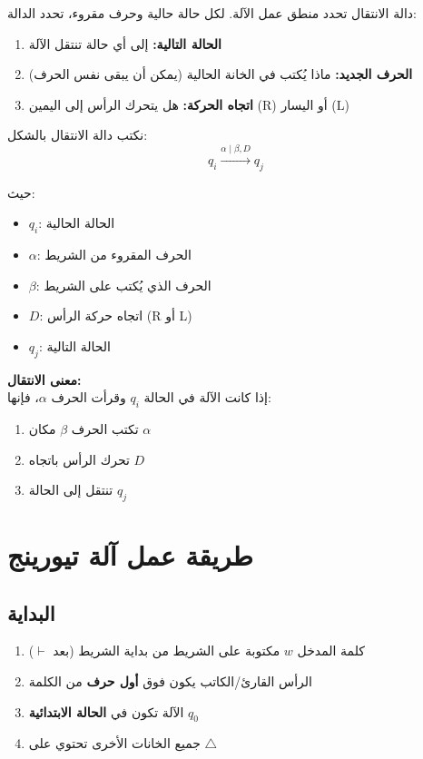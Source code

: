 \documentclass[14pt]{extarticle}
\begin{document}
دالة الانتقال تحدد منطق عمل الآلة. لكل حالة حالية وحرف مقروء، تحدد الدالة:

\begin{enumerate}
    \item \textbf{الحالة التالية:} إلى أي حالة تنتقل الآلة
    \item \textbf{الحرف الجديد:} ماذا يُكتب في الخانة الحالية (يمكن أن يبقى نفس الحرف)
    \item \textbf{اتجاه الحركة:} هل يتحرك الرأس إلى اليمين (\textenglish{R}) أو اليسار (\textenglish{L})
\end{enumerate}

\begin{boxSymbol}
نكتب دالة الانتقال بالشكل:
$$q_i \xrightarrow{\alpha \mid \beta, D} q_j$$

حيث:
\begin{itemize}
    \item $q_i$: الحالة الحالية
    \item $\alpha$: الحرف المقروء من الشريط
    \item $\beta$: الحرف الذي يُكتب على الشريط
    \item $D$: اتجاه حركة الرأس (\textenglish{R} أو \textenglish{L})
    \item $q_j$: الحالة التالية
\end{itemize}

\textbf{معنى الانتقال:}\\
إذا كانت الآلة في الحالة $q_i$ وقرأت الحرف $\alpha$، فإنها:
\begin{enumerate}
    \item تكتب الحرف $\beta$ مكان $\alpha$
    \item تحرك الرأس باتجاه $D$
    \item تنتقل إلى الحالة $q_j$
\end{enumerate}
\end{boxSymbol}

\clearpage

\section{طريقة عمل آلة تيورينج}

\subsection{البداية}

\begin{enumerate}
    \item كلمة المدخل $w$ مكتوبة على الشريط من بداية الشريط (بعد $\vdash$)
    \item الرأس القارئ/الكاتب يكون فوق \textbf{أول حرف} من الكلمة
    \item الآلة تكون في \textbf{الحالة الابتدائية} $q_0$
    \item جميع الخانات الأخرى تحتوي على $\triangle$
\end{enumerate}
\end{document}

